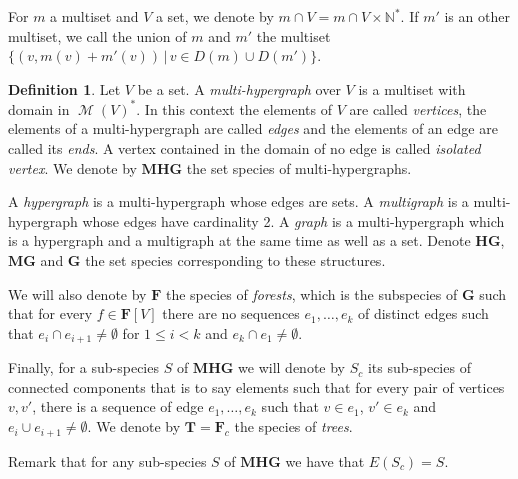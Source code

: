 \documentclass[a4paper]{article}
\DeclareMathOperator{\m}{\mathcal{M}}
\theoremstyle{definition}
\newtheorem{definition}{Definition}
\newcommand{\MHG}{\mathbf{MHG}}
\newcommand{\HG}{\mathbf{HG}}
\newcommand{\MG}{\mathbf{MG}}
\newcommand{\G}{\mathbf{G}}
\newcommand{\F}{\mathbf{F}}
\newcommand{\T}{\mathbf{T}}
\begin{document}
For $m$ a multiset and $V$ a set, we denote by $m\cap V = m\cap V\times\mathbb{N}^*$. 
If $m'$ is an other multiset, we call the union of $m$ and $m'$ the multiset 
$\{(v,m(v)+m'(v))\,|\, v\in D(m)\cup D(m')\}$.

\begin{definition}
Let $V$ be a set. A \textit{multi-hypergraph} over $V$ is a multiset with domain 
in $\m(V)^*$. In this context the elements of $V$ are called \textit{vertices}, 
the elements of a multi-hypergraph are called \textit{edges} and the elements of 
an edge are called its \textit{ends}. A vertex contained in the domain of no edge 
is called \textit{isolated vertex}. We denote by $\MHG$ the set species of multi-hypergraphs.

A \textit{hypergraph} is a multi-hypergraph whose edges are sets. A \textit{multigraph} 
is a multi-hypergraph whose edges have cardinality 2. A \textit{graph} is a 
multi-hypergraph which is a hypergraph and a multigraph at the same time as 
well as a set. Denote $\HG$, $\MG$ and $\G$ the set species corresponding to these structures.

We will also denote by $\F$ the species of \textit{forests}, which is the subspecies 
of $\G$ such that for every $f\in \F[V]$ there are no sequences $e_1,\dots, e_k$ 
of distinct edges such that $e_i\cap e_{i+1} \not = \emptyset$ for $1\leq i< k$ 
and $e_k\cap e_1 \not = \emptyset$.

Finally, for a sub-species $S$ of $\MHG$ we will denote by $S_c$ its sub-species 
of connected components that is to say elements such that for every pair of 
vertices $v,v'$, there is a sequence of edge $e_1,\dots, e_k$ such that 
$v\in e_1$, $v'\in e_k$ and $e_i\cup e_{i+1}\not = \emptyset$. We denote 
by $\T=\F_c$ the species of \textit{trees}.
\end{definition}

Remark that for any sub-species $S$ of $\MHG$ we have that $E(S_c) = S$.
\end{document}
